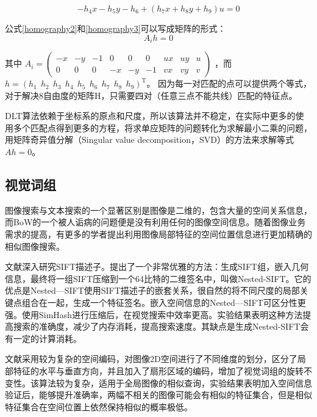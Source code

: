 \begin{equation}
\label{homography3}
-h_4x - h_5y - h_6 + (h_7x+h_8y+h_9)u = 0
\end{equation}

公式\eqref{homography2}和\eqref{homography3}可以写成矩阵的形式：
\begin{equation}
\label{homography4}
A_ih = 0
\end{equation}

其中
\(A_i = 
\begin{pmatrix}
-x & -y & -1 & 0 & 0 & 0 &ux & uy & u \\
0 & 0 & 0 & -x & -y & -1 &vx & vy & v 
\end{pmatrix}\)
，而
\(h = (h_1 \ \ h_2 \ \ h_3 \ \ h_4 \ \ h_5 \ \ h_6 \ \ h_7 \ \ h_8 \ \ h_9)^\mathrm{T}\)。
因为每一对匹配的点可以提供两个等式，对于解决8自由度的矩阵H，只需要四对（任意三点不能共线）匹配的特征点。

DLT算法依赖于坐标系的原点和尺度，所以该算法并不稳定，在实际中更多的使用多个匹配点得到更多的方程，将求单应矩阵的问题转化为求解最小二乘的问题，用矩阵奇异值分解（Singular value decomposition，SVD）的方法来求解等式\(Ah = 0\)。

\subsection{视觉词组}

图像搜索与文本搜索的一个显著区别是图像是二维的，包含大量的空间关系信息，而BoW的一个被人诟病的问题便是没有利用任何的图像空间信息。随着图像业务需求的提高，有更多的学者提出利用图像局部特征的空间位置信息进行更加精确的相似图像搜索\cite{Philbin:2007fk,Wu:2009bl,Zhou:2010tv,Zhou:2013jz,Xu:2013wc}。

文献\cite{Xu:2013wc}深入研究SIFT描述子。提出了一个非常优雅的方法：生成SIFT组，嵌入几何信息，最终将一组SIFT压缩到一个64比特的二维签名中，叫做Nested-SIFT。它的优点是Nested—SIFT使用SIFT描述子的嵌套关系，很自然的将不同尺度的局部关键点组合在一起，生成一个特征签名。嵌入空间信息的Nested—SIFT可区分性更强。使用SimHash进行压缩后，在视觉搜索中效率更高。实验结果表明这种方法提高搜索的准确度，减少了内存消耗，提高搜索速度。其缺点是生成Nested-SIFT会有一定的计算消耗。

文献\cite{Zhou:2013jz}采用较为复杂的空间编码，对图像2D空间进行了不同维度的划分，区分了局部特征的水平与垂直方向，并且加入了扇形区域的编码，增加了视觉词组的旋转不变性。该算法较为复杂，适用于全局图像的相似查询，实验结果表明加入空间信息验证后，能够提升准确率，两幅不相关的图像可能会有相似的特征集合，但是相似特征集合在空间位置上依然保持相似的概率极低。

